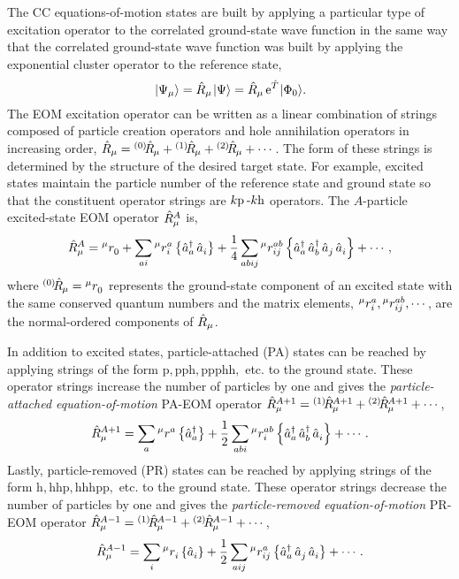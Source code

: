 \documentclass[thesis.tex]{subfiles}
\begin{document}
The CC equations-of-motion states are built by applying a particular type of excitation operator to the correlated ground-state wave function in the same way that the correlated ground-state wave function was built by applying the exponential cluster operator to the reference state,
\begin{equation}\label{eq:eom_def}
  \hspace{1pt}\lvert \Psi_{\mu} \rangle = \hat{R}\hspace{-0.1pt}_{\mu}\hspace{1pt}\lvert \Psi \rangle = \hat{R}\hspace{-0.1pt}_{\mu}\operatorname{e}^{\hat{T}\hspace{-0.25pt}}\hspace{1pt}\lvert \Phi_{0} \rangle.
\end{equation}
The EOM excitation operator can be written as a linear combination of strings composed of particle creation operators and hole annihilation operators in increasing order, $\hat{R}\hspace{-0.1pt}_{\mu} = {}^{\left(0\right)}\hspace{-2pt}\hat{R}\hspace{-0.5pt}_{\mu} + {}^{\left(1\right)}\hspace{-2pt}\hat{R}\hspace{-0.5pt}_{\mu} + {}^{\left(2\right)}\hspace{-2pt}\hat{R}\hspace{-0.5pt}_{\mu} + \cdots$.  The form of these strings is determined by the structure of the desired target state.  For example, excited states maintain the particle number of the reference state and ground state so that the constituent operator strings are $k\mathrm{p}\hspace{2pt}\text{-}k\mathrm{h}$ operators.  The $A$-particle excited-state EOM operator $\hat{R}\hspace{-0.1pt}^{A}_{\mu}$ is,
\begin{equation}
  \hat{R}\hspace{-0.1pt}^{A}_{\mu} = {}^{\mu}r^{}_{0} + \sum_{ai}{}^{\mu}r^{a}_{i}\left\{\mathop{\hat{a}^{\dagger}_{a}}\mathop{\hat{a}^{}_{i}}\right\} + \frac{1}{4}\sum_{abij}{}^{\mu}r^{ab}_{ij}\left\{\mathop{\hat{a}^{\dagger}_{a}}\mathop{\hat{a}^{\dagger}_{b}}\mathop{\hat{a}^{}_{j}}\mathop{\hat{a}^{}_{i}}\right\} + \cdots,
\end{equation}
where ${}^{\left(0\right)}\hspace{-2pt}\hat{R}\hspace{-0.5pt}_{\mu} = {}^{\mu}r^{}_{0}$ represents the ground-state component of an excited state with the same conserved quantum numbers and the matrix elements, ${}^{\mu}r^{a}_{i}, {}^{\mu}r^{ab}_{ij}, \cdots$, are the normal-ordered components of $\hat{R}\hspace{-0.1pt}_{\mu}$.

In addition to excited states, particle-attached (PA) states can be reached by applying strings of the form $\mathrm{p,pph,ppphh,}$ etc. to the ground state.  These operator strings increase the number of particles by one and gives the \textit{particle-attached equation-of-motion} PA-EOM operator $\hat{R}\hspace{-0.1pt}^{A+1}_{\mu} = {}^{\left(1\right)}\hspace{-2pt}\hat{R}\hspace{-0.5pt}^{A+1}_{\mu} + {}^{\left(2\right)}\hspace{-2pt}\hat{R}\hspace{-0.5pt}^{A+1}_{\mu} + \cdots $,
\begin{equation}
  \hat{R}\hspace{-0.1pt}^{A+1}_{\mu} = \sum_{a}{}^{\mu}r^{a}_{}\left\{\mathop{\hat{a}^{\dagger}_{a}}\right\} + \frac{1}{2}\sum_{abi}{}^{\mu}r^{ab}_{i}\left\{\mathop{\hat{a}^{\dagger}_{a}}\mathop{\hat{a}^{\dagger}_{b}}\mathop{\hat{a}^{}_{i}}\right\} + \cdots.
\end{equation}
Lastly, particle-removed (PR) states can be reached by applying strings of the form $\mathrm{h,hhp,hhhpp,}$ etc. to the ground state.  These operator strings decrease the number of particles by one and gives the \textit{particle-removed equation-of-motion} PR-EOM operator $\hat{R}\hspace{-0.1pt}^{A-1}_{\mu} = {}^{\left(1\right)}\hspace{-2pt}\hat{R}\hspace{-0.5pt}^{A-1}_{\mu} + {}^{\left(2\right)}\hspace{-2pt}\hat{R}\hspace{-0.5pt}^{A-1}_{\mu} + \cdots $,
\begin{equation}
  \hat{R}\hspace{-0.1pt}^{A-1}_{\mu} = \sum_{i}{}^{\mu}r^{}_{i}\left\{\mathop{\hat{a}^{}_{i}}\right\} + \frac{1}{2}\sum_{aij}{}^{\mu}r^{a}_{ij}\left\{\mathop{\hat{a}^{\dagger}_{a}}\mathop{\hat{a}^{}_{j}}\mathop{\hat{a}^{}_{i}}\right\} + \cdots.
\end{equation}
\end{document}
